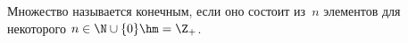 
Множество называется конечным, если оно состоит из~$n$ элементов для некоторого $n\in \N\cup\{0\}\hm=\Z_+$.
